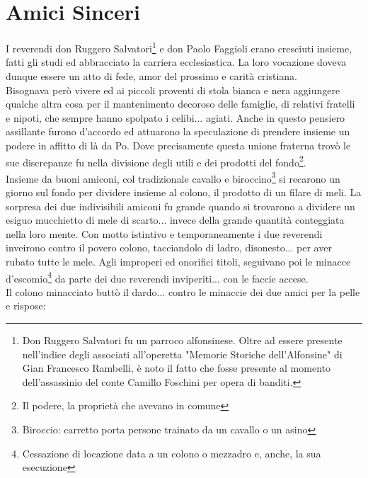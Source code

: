 
\chapter{Amici Sinceri}
I reverendi don Ruggero Salvatori\footnote{Don Ruggero Salvatori fu un parroco alfonsinese. Oltre ad essere presente nell'indice degli associati all'operetta "Memorie Storiche dell'Alfonsine" di Gian Francesco Rambelli, è noto il fatto che fosse presente al momento dell'assassinio del conte Camillo Foschini per opera di banditi.} e don Paolo Faggioli erano cresciuti insieme, fatti gli studi ed abbracciato la carriera ecclesiastica. La loro vocazione doveva dunque essere un atto di fede, amor del prossimo e carità cristiana.\\
Bisognava però vivere ed ai piccoli proventi di stola bianca e nera aggiungere qualche altra cosa per il mantenimento decoroso delle famiglie, di relativi fratelli e nipoti, che sempre hanno spolpato i celibi... agiati. Anche in questo pensiero assillante furono d'accordo ed attuarono la speculazione di prendere insieme un podere in affitto di là da Po. Dove precisamente questa unione fraterna trovò le sue discrepanze fu nella divisione degli utili e dei prodotti del fondo\footnote{Il podere, la proprietà che avevano in comune}. \\
Insieme da buoni amiconi, col tradizionale cavallo e biroccino\footnote{Biroccio: carretto porta persone trainato da un cavallo o un asino} si recarono un giorno sul fondo per dividere insieme al colono, il prodotto di un filare di meli. La sorpresa dei due indivisibili amiconi fu grande quando si trovarono a dividere un esiguo mucchietto di mele di scarto... invece della grande quantità conteggiata nella loro mente. 
Con motto istintivo e temporaneamente i due reverendi inveirono contro il povero colono, tacciandolo di ladro, disonesto... per aver rubato tutte le mele. Agli improperi ed onorifici titoli, seguivano poi le minacce d'escomio\footnote{Cessazione di locazione data a un colono o mezzadro e, anche, la sua esecuzione} da parte dei due reverendi inviperiti... con le faccie accese.\\
Il colono minacciato buttò il dardo... contro le minaccie dei due amici per la pelle e rispose: \\
